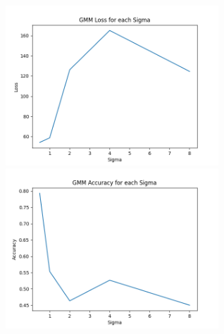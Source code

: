\includegraphics[width=3.15in]{../figs/gmm_loss.png} \hspace{0.1in}
\includegraphics[width=3.15in]{../figs/gmm_accuracy.png} \\
